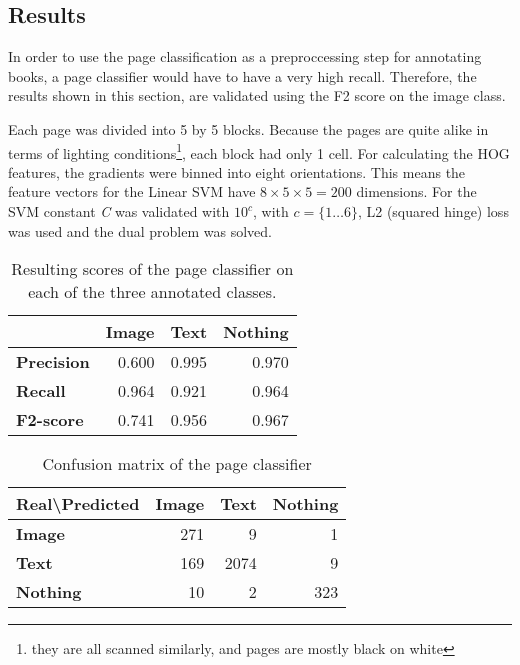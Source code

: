 \subsection{Results}
\label{subsec:pageclasresults}

In order to use the page classification as a preproccessing step for annotating
books, a page classifier would have to have a very high recall. Therefore, the
results shown in this section, are validated using the F2 score on the image
class. 

Each page was divided into 5 by 5 blocks. Because the pages
are quite alike in terms of lighting conditions\footnote{they are all scanned
similarly, and pages are mostly black on white}, each block had only 1 cell. For
calculating the HOG features, the gradients were binned into eight orientations.
This means the feature vectors for the Linear SVM have $8 \times 5 \times 5 =
200$ dimensions. 
For the SVM constant \emph{C} was validated with $10^c$, with $c = \{1 \dots
6\}$, L2 (squared hinge) loss was used and the dual problem was solved. 

\begin{table}
\centering
\begin{tabular}{l r r r}
\hline
  & \textbf{Image} & \textbf{Text} & \textbf{Nothing} \\\hline
\textbf{Precision} & 0.600  & 0.995 & 0.970 \\
\textbf{Recall} & 0.964  & 0.921 & 0.964 \\
\textbf{F2-score} & 0.741 & 0.956 & 0.967 \\\hline
\end{tabular}
\caption{Resulting scores of the page classifier on each of the three annotated
classes.}
\label{tab:pageclasresults}
\end{table}

\begin{table}
\centering
\begin{tabular}{l r r r}
\hline
Real\textbackslash Predicted & \textbf{Image} & \textbf{Text} & \textbf{Nothing} \\\hline
\textbf{Image} & 271 & 9 & 1 \\
\textbf{Text} & 169 & 2074 & 9 \\
\textbf{Nothing} & 10 & 2 & 323\\
\hline
\end{tabular}
\caption{Confusion matrix of the page classifier}
\label{tab:pageclascm}
\end{table}

